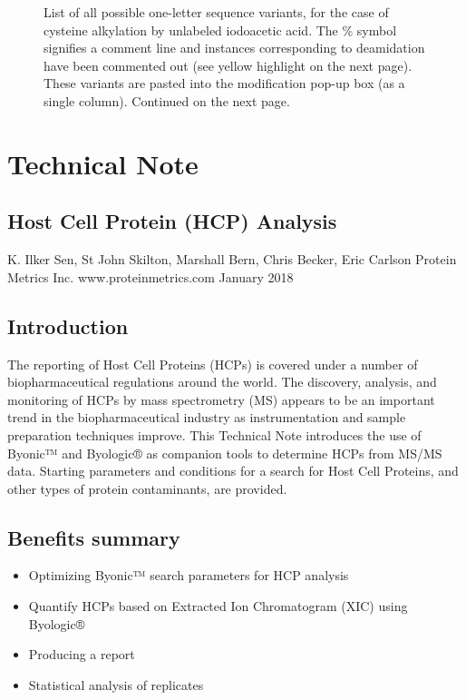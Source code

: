 \documentclass[letterpaper,10pt,oneside,english]{sphinxmanual}
\begin{document}
\begin{figure}[H]
\centering
\capstart

\noindent{}
\caption{List of all possible one-letter sequence variants, for the case of cysteine alkylation by unlabeled iodoacetic acid.  The \% symbol signifies a comment line and instances corresponding to deamidation have been commented out (see yellow highlight on the next page).  These variants are pasted into the modification pop-up box (as a single column).  Continued on the next page.}\label{\detokenize{applicationnote:id2}}\end{figure}


\chapter{Technical Note}
\label{\detokenize{internal:technical-note}}\label{\detokenize{internal::doc}}

\section{Host Cell Protein (HCP) Analysis}
\label{\detokenize{internal:host-cell-protein-hcp-analysis}}
K. Ilker Sen, St John Skilton, Marshall Bern, Chris Becker, Eric Carlson Protein Metrics Inc.
www.proteinmetrics.com
January 2018


\section{Introduction}
\label{\detokenize{internal:introduction}}
The reporting of Host Cell Proteins (HCPs) is covered under a number of biopharmaceutical regulations around the world. The discovery, analysis, and monitoring of HCPs by mass spectrometry (MS) appears to be an important trend in the biopharmaceutical industry as instrumentation and sample preparation techniques improve. This Technical Note introduces the use of Byonic™ and Byologic® as companion tools to determine HCPs from MS/MS data. Starting parameters and conditions for a search for Host Cell Proteins, and other types of protein contaminants, are provided.


\section{Benefits summary}
\label{\detokenize{internal:benefits-summary}}\begin{itemize}
\item {} 
Optimizing Byonic™ search parameters for HCP analysis

\item {} 
Quantify HCPs based on Extracted Ion Chromatogram (XIC) using Byologic®

\item {} 
Producing a report

\item {} 
Statistical analysis of replicates

\end{itemize}

\begin{figure}[H]
\centering

\noindent{}
\end{figure}



\renewcommand{\indexname}{Index}
\printindex
\end{document}
